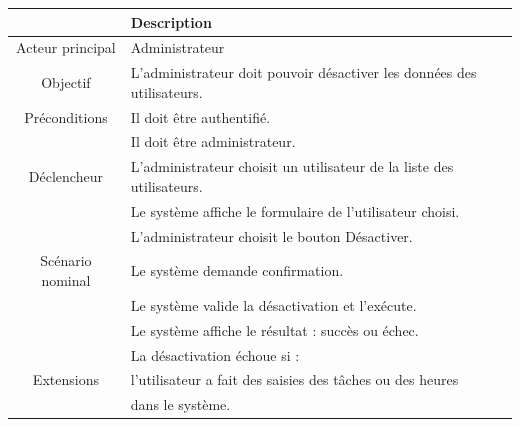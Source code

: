 \begin{center}
\begin{tabular}{|c|l|}
\hline 
&\textbf { Description }\\\hline 
    Acteur principal & Administrateur \\\hline 
    Objectif&L’administrateur doit pouvoir désactiver les données des utilisateurs.\\\hline
    Préconditions&Il doit être authentifié.  \\&Il doit être administrateur.\\\hline 
    Déclencheur&L’administrateur choisit un utilisateur de la liste des utilisateurs.\\\hline 
    &Le système affiche le formulaire de l’utilisateur choisi.    \\&L’administrateur choisit le bouton Désactiver.  \\
    Scénario nominal&Le système demande confirmation. \\
    &Le système valide la désactivation et l’exécute.  \\
    &Le système affiche le résultat : succès ou échec. \\\hline
    &La désactivation échoue si :   \\
    Extensions&l’utilisateur a fait des saisies des tâches ou des heures   \\
    &dans le système.\\\hline
\end{tabular}
\label{desc_desact_ut}
\end{center}\newpage
